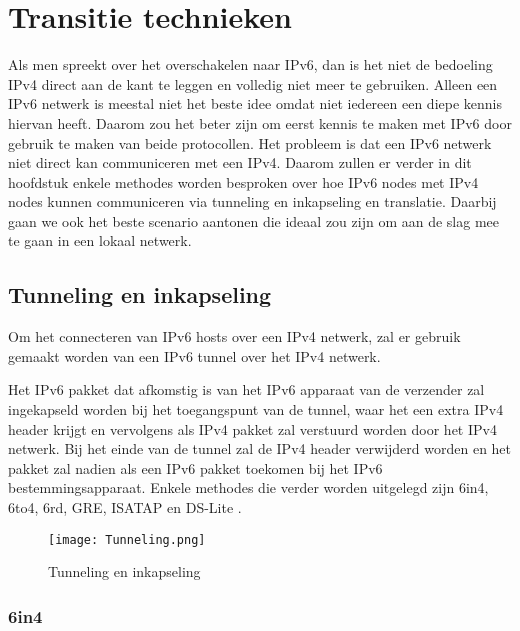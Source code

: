 
\chapter{Transitie technieken}
\label{ch:h3}

Als men spreekt over het overschakelen naar IPv6, dan is het niet de bedoeling IPv4 direct aan de kant te leggen en volledig niet meer te gebruiken. Alleen een IPv6 netwerk is meestal niet het beste idee omdat niet iedereen een diepe kennis hiervan heeft. Daarom zou het beter zijn om eerst kennis te maken met IPv6 door gebruik te maken van beide protocollen. Het probleem is dat een IPv6 netwerk niet direct kan communiceren met een IPv4. Daarom zullen er verder in dit hoofdstuk enkele methodes worden besproken over hoe IPv6 nodes met IPv4 nodes kunnen communiceren via tunneling en inkapseling en translatie. Daarbij gaan we ook het beste scenario aantonen die ideaal zou zijn om aan de slag mee te gaan in een lokaal netwerk.

\section{Tunneling en inkapseling}

Om het connecteren van IPv6 hosts over een IPv4 netwerk, zal er gebruik gemaakt worden van een IPv6 tunnel over het IPv4 netwerk.

Het IPv6 pakket dat afkomstig is van het IPv6 apparaat van de verzender zal ingekapseld worden bij het toegangspunt van de tunnel, waar het een extra IPv4 header krijgt en vervolgens als IPv4 pakket zal verstuurd worden door het IPv4 netwerk. Bij het einde van de tunnel zal de IPv4 header verwijderd worden en het pakket zal nadien als een IPv6 pakket toekomen bij het IPv6 bestemmingsapparaat. Enkele methodes die verder worden uitgelegd zijn 6in4, 6to4, 6rd, GRE, ISATAP en DS-Lite \autocite{RIPE2016}.

\begin{figure}
\texttt{[image: Tunneling.png]}
\centering
\caption{Tunneling en inkapseling \autocite{RIPE2016}}
\centering
\end{figure}

\subsection{6in4}

